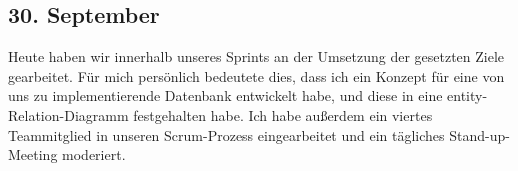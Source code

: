 \subsection{30. September}
Heute haben wir innerhalb unseres Sprints an der Umsetzung der gesetzten Ziele gearbeitet. Für mich persönlich bedeutete dies, dass ich ein Konzept für eine von uns zu implementierende Datenbank entwickelt habe, und diese in eine entity-Relation-Diagramm festgehalten habe. Ich habe außerdem ein viertes Teammitglied in unseren Scrum-Prozess eingearbeitet und ein tägliches Stand-up-Meeting moderiert.
